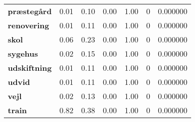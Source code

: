 \begin{landscape}
\begin{longtable}{lllllrr}
\textbf{præstegård} & 0.01 & 0.10 & 0.00 & 1.00 & 0 & 0.000000 \\
\textbf{renovering} & 0.01 & 0.11 & 0.00 & 1.00 & 0 & 0.000000 \\
\textbf{skol} & 0.06 & 0.23 & 0.00 & 1.00 & 0 & 0.000000 \\
\textbf{sygehus} & 0.02 & 0.15 & 0.00 & 1.00 & 0 & 0.000000 \\
\textbf{udskiftning} & 0.01 & 0.11 & 0.00 & 1.00 & 0 & 0.000000 \\
\textbf{udvid} & 0.01 & 0.11 & 0.00 & 1.00 & 0 & 0.000000 \\
\textbf{vejl} & 0.02 & 0.13 & 0.00 & 1.00 & 0 & 0.000000 \\
\textbf{train} & 0.82 & 0.38 & 0.00 & 1.00 & 0 & 0.000000 \\
\end{longtable}\end{landscape}
